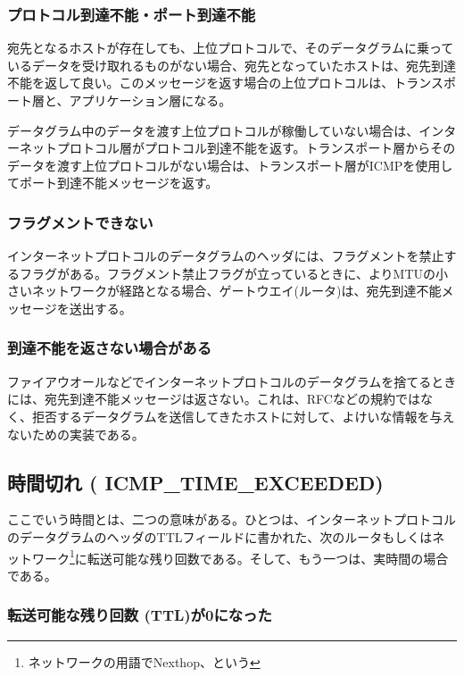 \subsubsection{プロトコル到達不能・ポート到達不能}

宛先となるホストが存在しても、上位プロトコルで、そのデータグラムに乗っているデータを受け取れるものがない場合、宛先となっていたホストは、宛先到達不能を返して良い。このメッセージを返す場合の上位プロトコルは、トランスポート層と、アプリケーション層になる。

データグラム中のデータを渡す上位プロトコルが稼働していない場合は、インターネットプロトコル層がプロトコル到達不能を返す。トランスポート層からそのデータを渡す上位プロトコルがない場合は、トランスポート層がICMPを使用してポート到達不能メッセージを返す。

\subsubsection{フラグメントできない}

インターネットプロトコルのデータグラムのヘッダには、フラグメントを禁止するフラグがある。フラグメント禁止フラグが立っているときに、よりMTUの小さいネットワークが経路となる場合、ゲートウエイ(ルータ)は、宛先到達不能メッセージを送出する。

\subsubsection{到達不能を返さない場合がある}

ファイアウオールなどでインターネットプロトコルのデータグラムを捨てるときには、宛先到達不能メッセージは返さない。これは、RFCなどの規約ではなく、拒否するデータグラムを送信してきたホストに対して、よけいな情報を与えないための実装である。

\subsection{時間切れ ( ICMP\_TIME\_EXCEEDED)}

ここでいう時間とは、二つの意味がある。ひとつは、インターネットプロトコルのデータグラムのヘッダのTTLフィールドに書かれた、次のルータもしくはネットワーク\footnote{ネットワークの用語でNexthop、という}に転送可能な残り回数である。そして、もう一つは、実時間の場合である。
\subsubsection{転送可能な残り回数 (TTL)が0になった}

